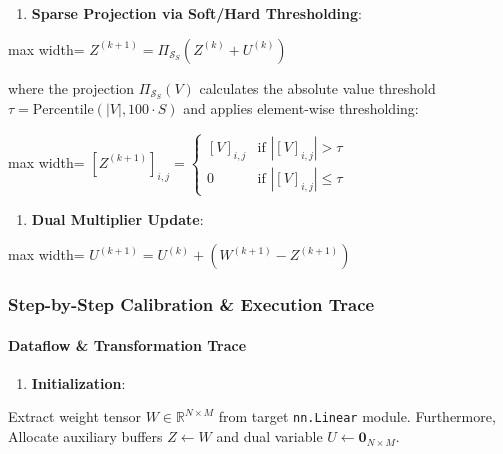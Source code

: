 \begin{enumerate}
\item \textbf{Sparse Projection via Soft/Hard Thresholding}:
\end{enumerate}
\begin{center}
\begin{adjustbox}{max width=\columnwidth}
$\displaystyle
Z^{(k+1)} = \Pi_{\mathcal{S}_S} \left( Z^{(k)} + U^{(k)} \right)
$
\end{adjustbox}
\end{center}
where the projection $\Pi_{\mathcal{S}_S}(V)$ calculates the absolute value threshold $\tau = \text{Percentile}(|V|, 100 \cdot S)$ and applies element-wise thresholding:
\begin{center}
\begin{adjustbox}{max width=\columnwidth}
$\displaystyle
[Z^{(k+1)}]_{i,j} = \begin{cases} [V]_{i,j} & \text{if } |[V]_{i,j}| > \tau \\ 0 & \text{if } |[V]_{i,j}| \le \tau \end{cases}
$
\end{adjustbox}
\end{center}

\begin{enumerate}
\item \textbf{Dual Multiplier Update}:
\end{enumerate}
\begin{center}
\begin{adjustbox}{max width=\columnwidth}
$\displaystyle
U^{(k+1)} = U^{(k)} + \left( W^{(k+1)} - Z^{(k+1)} \right)
$
\end{adjustbox}
\end{center}


\subsubsection*{Step-by-Step Calibration \& Execution Trace}

\paragraph{Dataflow \& Transformation Trace}

\begin{enumerate}
\item \textbf{Initialization}:
\end{enumerate}
Extract weight tensor $W \in \mathbb{R}^{N \times M}$ from target \texttt{nn.Linear} module. Furthermore, Allocate auxiliary buffers $Z \leftarrow W$ and dual variable $U \leftarrow \mathbf{0}_{N \times M}$.

